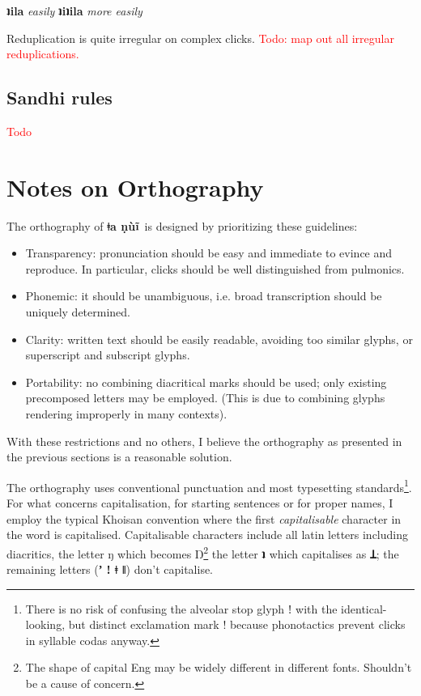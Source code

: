 \documentclass[11pt]{book}
\newcommand{\qcn}[1]{\textbf{#1}}
\newcommand{\langname}{\qcn{ǂa ṇùĩ}~}
\newcommand{\transl}[2]{\qcn{#1} \emph{#2}}
\newcommand{\cmnt}[1]{\textcolor{red}{#1}}
\begin{document}
\begin{center}
\transl{ʇila}{easily} \textrightarrow \transl{ʇiʇila}{more easily}
\end{center}

Reduplication is quite irregular on complex clicks. \cmnt{Todo: map out all irregular reduplications.}

\subsection{Sandhi rules}

\cmnt{Todo}



\section{Notes on Orthography}

The orthography of \langname is designed by prioritizing these guidelines:

\begin{itemize}
	\item Transparency: pronunciation should be easy and immediate to evince and reproduce. In particular, clicks should be well distinguished from pulmonics.
	\item Phonemic: it should be unambiguous, i.e. broad transcription should be uniquely determined.
	\item Clarity: written text should be easily readable, avoiding too similar glyphs, or superscript and subscript glyphs.
	\item Portability: no combining diacritical marks should be used; only existing precomposed letters may be employed. (This is due to combining glyphs rendering improperly in many contexts). 
\end{itemize}

With these restrictions and no others, I believe the orthography as presented in the previous sections is a reasonable solution.

The orthography uses conventional punctuation and most typesetting standards\footnote{There is no risk of confusing the alveolar stop glyph ǃ with the identical-looking, but distinct exclamation mark ! because phonotactics prevent clicks in syllable codas anyway.}. For what concerns capitalisation, for starting sentences or for proper names, I employ the typical Khoisan convention where the first \emph{capitalisable} character in the word is capitalised. Capitalisable characters include all latin letters including diacritics, the letter ŋ which becomes Ŋ\footnote{The shape of capital Eng may be widely different in different fonts. Shouldn't be a cause of concern.} the letter \qcn{ʇ} which capitalises as \qcn{Ʇ}; the remaining letters (\qcn{ʼ ǃ ǂ ǁ}) don't capitalise.
\end{document}
